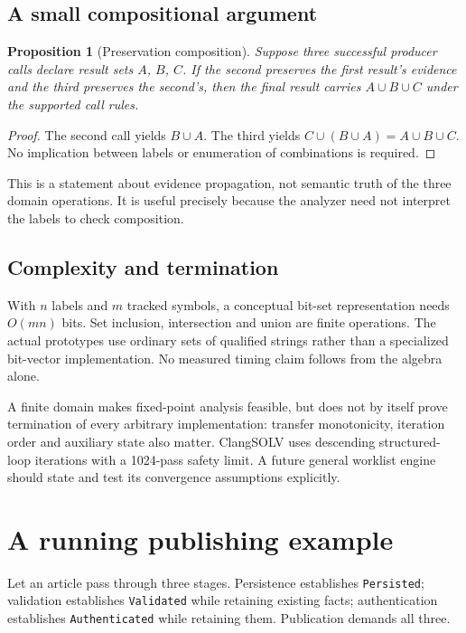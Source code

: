 \documentclass[11pt]{article}
\newtheorem{proposition}{Proposition}
\begin{document}
\subsection{A small compositional argument}
\begin{proposition}[Preservation composition]
Suppose three successful producer calls declare result sets $A$, $B$, $C$.
If the second preserves the first result's evidence and the third preserves
the second's, then the final result carries $A\cup B\cup C$ under the supported
call rules.
\end{proposition}
\begin{proof}
The second call yields $B\cup A$. The third yields
$C\cup(B\cup A)=A\cup B\cup C$. No implication between labels or enumeration
of combinations is required.
\end{proof}
This is a statement about evidence propagation, not semantic truth of the
three domain operations. It is useful precisely because the analyzer need
not interpret the labels to check composition.

\subsection{Complexity and termination}
With $n$ labels and $m$ tracked symbols, a conceptual bit-set representation
needs $O(mn)$ bits. Set inclusion, intersection and union are finite operations.
The actual prototypes use ordinary sets of qualified strings rather than a
specialized bit-vector implementation. No measured timing claim follows from
the algebra alone.

A finite domain makes fixed-point analysis feasible, but does not by itself
prove termination of every arbitrary implementation: transfer monotonicity,
iteration order and auxiliary state also matter. ClangSOLV uses descending
structured-loop iterations with a 1024-pass safety limit. A future general
worklist engine should state and test its convergence assumptions explicitly.

\section{A running publishing example}
Let an article pass through three stages. Persistence establishes
\texttt{Persisted}; validation establishes \texttt{Validated} while retaining
existing facts; authentication establishes \texttt{Authenticated} while
retaining them. Publication demands all three.
\end{document}
